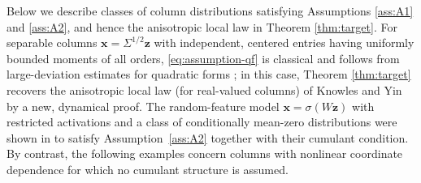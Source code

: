 \documentclass[11pt,reqno]{amsart}
\def\x{\mathbf{x}}
\def\z{\mathbf{z}}
\theoremstyle{definition}
\numberwithin{equation}{section}
\numberwithin{figure}{section}
\begin{document}
Below we describe classes of column distributions satisfying Assumptions \ref{ass:A1} and \ref{ass:A2}, and hence the anisotropic local law in Theorem \ref{thm:target}. For separable columns $\x=\Sigma^{1/2}\z$ with independent, centered entries having uniformly bounded moments of all orders, \eqref{eq:assumption-qf} is classical and follows from large-deviation estimates for quadratic forms \cite[Theorem~7.7]{erdHos2017dynamical}; in this case, Theorem \ref{thm:target} recovers the anisotropic local law (for real-valued columns) of Knowles and Yin \cite{knowles2017anisotropic} by a new, dynamical proof. The random-feature model $\x=\sigma(W\z)$ with restricted activations and a class of conditionally mean-zero distributions were shown in \cite{fan2026anisotropic} to satisfy Assumption~\ref{ass:A2} together with their cumulant condition. By contrast, the following examples concern columns with nonlinear coordinate dependence for which no cumulant structure is assumed.
\end{document}
